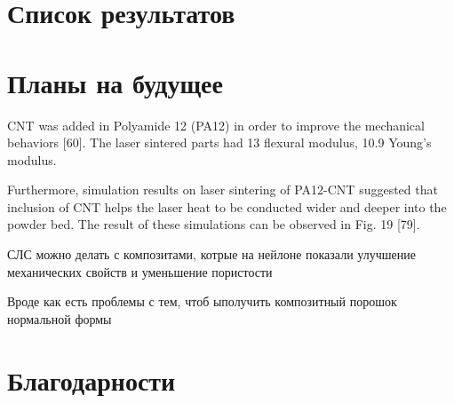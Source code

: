 \section{Список результатов}
\section{Планы на будущее}

CNT was added in Polyamide 12 (PA12) in order to improve the
mechanical behaviors [60]. The laser sintered parts had 13%
flexural modulus, 10.9%
Young’s modulus. \cite{comp-review}

Furthermore, simulation results on
laser sintering of PA12-CNT suggested that inclusion of CNT helps
the laser heat to be conducted wider and deeper into the powder
bed. The result of these simulations can be observed in Fig. 19 [79].

СЛС можно делать с композитами, котрые на нейлоне показали улучшение механических свойств и уменьшение пористости
\cite{sls-composite}

Вроде как есть проблемы с тем, чтоб ыполучить композитный порошок нормальной формы \cite{sls-powder-problem}



\section{Благодарности}
